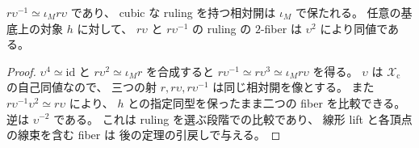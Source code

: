 \begin{corollary}
$r\upsilon^{-1}\simeq\iota_M r\upsilon$ であり、
cubic な ruling を持つ相対開は $\iota_M$ で保たれる。
任意の基底上の対象 $h$ に対して、
$r\upsilon$ と $r\upsilon^{-1}$ の ruling の $2$-fiber は
$\upsilon^2$ により同値である。
\end{corollary}
\begin{proof}
$\upsilon^4\simeq\mathrm{id}$ と
$r\upsilon^2\simeq\iota_M r$ を合成すると
$r\upsilon^{-1}\simeq r\upsilon^3\simeq\iota_M r\upsilon$ を得る。
$\upsilon$ は $\mathcal X_{\mathrm{c}}$ の自己同値なので、
三つの射 $r,r\upsilon,r\upsilon^{-1}$ は同じ相対開を像とする。
また $r\upsilon^{-1}\upsilon^2\simeq r\upsilon$ により、
$h$ との指定同型を保ったまま二つの fiber を比較できる。
逆は $\upsilon^{-2}$ である。
これは ruling を選ぶ段階での比較であり、
線形 lift と各頂点の線束を含む fiber は
後の定理の引戻しで与える。
\end{proof}

